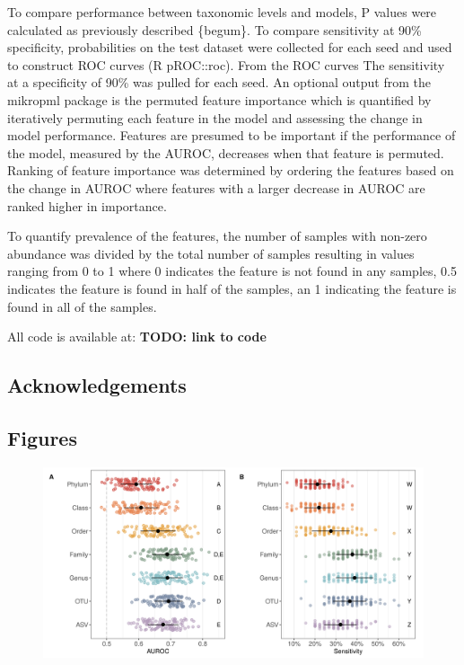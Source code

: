 \documentclass[]{article}
\begin{document}
To compare performance between taxonomic levels and models, P values
were calculated as previously described \{begum\}. To compare
sensitivity at 90\% specificity, probabilities on the test dataset were
collected for each seed and used to construct ROC curves (R pROC::roc).
From the ROC curves The sensitivity at a specificity of 90\% was pulled
for each seed. An optional output from the mikropml package is the
permuted feature importance which is quantified by iteratively permuting
each feature in the model and assessing the change in model performance.
Features are presumed to be important if the performance of the model,
measured by the AUROC, decreases when that feature is permuted. Ranking
of feature importance was determined by ordering the features based on
the change in AUROC where features with a larger decrease in AUROC are
ranked higher in importance.

To quantify prevalence of the features, the number of samples with
non-zero abundance was divided by the total number of samples resulting
in values ranging from 0 to 1 where 0 indicates the feature is not found
in any samples, 0.5 indicates the feature is found in half of the
samples, an 1 indicating the feature is found in all of the samples.

All code is available at: \textbf{TODO: link to code}

\subsection{Acknowledgements}\label{acknowledgements}

\newpage

\subsection{Figures}\label{figures}

\begin{figure}[htbp]
\centering
\includegraphics{figure_1.png}
\end{figure}
\end{document}

